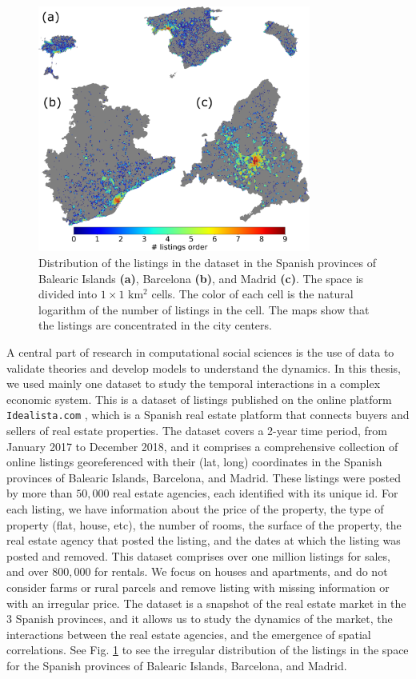 \begin{figure}
    \centering
    \includegraphics[width=0.80\textwidth]{Figs/Introduction/adds_size_map.pdf}
    \caption[Listings distribution in space]{Distribution of the listings in the dataset in the Spanish provinces of Balearic Islands \textbf{(a)}, Barcelona \textbf{(b)}, and Madrid \textbf{(c)}. The space is divided into $1 \times 1$ km$^2$ cells. The color of each cell is the natural logarithm of the number of listings in the cell. The maps show that the listings are concentrated in the city centers. }
    \label{fig:maps_adds}
\end{figure}

A central part of research in computational social sciences is the use of data to validate theories and develop models to understand the dynamics. In this thesis, we used mainly one dataset to study the temporal interactions in a complex economic system. This is a dataset of listings published on the online platform \texttt{Idealista.com} \cite{idealista}, which is a Spanish real estate platform that connects buyers and sellers of real estate properties. The dataset covers a 2-year time period, from January 2017 to December 2018, and it comprises a comprehensive collection of online listings georeferenced with their (lat, long) coordinates in the Spanish provinces of Balearic Islands, Barcelona, and Madrid. These listings were posted by more than $50,000$ real estate agencies, each identified with its unique id. For each listing, we have information about the price of the property, the type of property (flat, house, etc), the number of rooms, the surface of the property, the real estate agency that posted the listing, and the dates at which the listing was posted and removed. This dataset comprises over one million listings for sales, and over $800,000$ for rentals. We focus on houses and apartments, and do not consider farms or rural parcels and remove listing with missing information or with an irregular price. The dataset is a snapshot of the real estate market in the 3 Spanish provinces, and it allows us to study the dynamics of the market, the interactions between the real estate agencies, and the emergence of spatial correlations. See Fig. \ref{fig:maps_adds} to see the irregular distribution of the listings in the space for the Spanish provinces of Balearic Islands, Barcelona, and Madrid.

